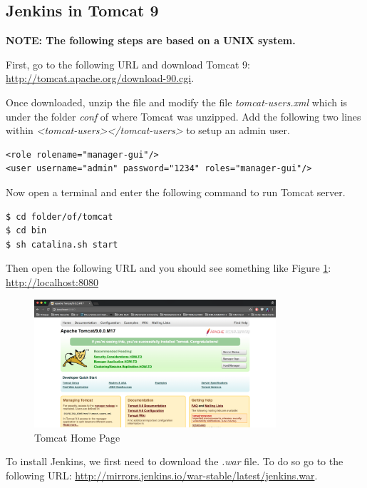 \subsection{Jenkins in Tomcat 9}
\textbf{NOTE: The following steps are based on a UNIX system.}

First, go to the following URL and download Tomcat 9: \url{http://tomcat.apache.org/download-90.cgi}.

Once downloaded, unzip the file and modify the file \emph{tomcat-users.xml} which is under the folder \emph{conf} of where Tomcat was unzipped. Add the following two lines within \emph{<tomcat-users></tomcat-users>} to setup an admin user.

\begin{verbatim}
<role rolename="manager-gui"/>
<user username="admin" password="1234" roles="manager-gui"/>
\end{verbatim}

Now open a terminal and enter the following command to run Tomcat server.

\begin{verbatim}
$ cd folder/of/tomcat
$ cd bin
$ sh catalina.sh start
\end{verbatim}

Then open the following URL and you should see something like Figure \ref{fig:tomcat-01}: \url{http://localhost:8080}

\begin{figure}[H]
	\centering
    \includegraphics[width=0.8\textwidth]{grafiken/tomcat-01}
    \caption{Tomcat Home Page}
    \label{fig:tomcat-01}
\end{figure}

To install Jenkins, we first need to download the \emph{.war} file. To do so go to the following URL: \url{http://mirrors.jenkins.io/war-stable/latest/jenkins.war}.

